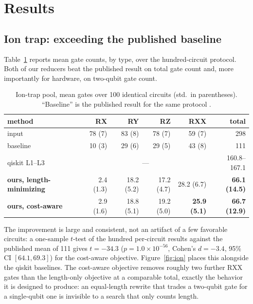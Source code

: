 \documentclass[11pt]{article}
\begin{document}
\section{Results}
\label{sec:results}

\subsection{Ion trap: exceeding the published baseline}
\label{sec:ion-result}

Table~\ref{tab:ion} reports mean gate counts, by type, over the
hundred-circuit protocol. Both of our reducers beat the published result
on total gate count and, more importantly for hardware, on two-qubit gate
count.

\begin{table}[H]
\centering
\caption{Ion-trap pool, mean gates over 100 identical circuits (std.\ in
parentheses). ``Baseline'' is the published result for the same protocol
\cite{Rosenhahn2025Optimization}.}
\label{tab:ion}
\begin{tabular}{lrrrrr}
\toprule
method & RX & RY & RZ & RXX & total \\
\midrule
input             & 78 (7)      & 83 (8)      & 78 (7)      & 59 (7)      & 298 \\
baseline \cite{Rosenhahn2025Optimization} & 10 (3) & 29 (6) & 29 (5) & 43 (8) & 111 \\
qiskit L1--L3     & \multicolumn{4}{c}{---}                              & 160.8--167.1 \\
\textbf{ours, length-minimizing} & 2.4 (1.3)  & 18.2 (5.2) & 17.2 (4.7) & 28.2 (6.7) & \textbf{66.1 (14.5)} \\
\textbf{ours, cost-aware}        & 2.9 (1.6)  & 18.8 (5.1) & 19.2 (5.0) & \textbf{25.9 (5.1)} & \textbf{66.7 (12.9)} \\
\bottomrule
\end{tabular}
\end{table}

The improvement is large and consistent, not an artifact of a few
favorable circuits: a one-sample $t$-test of the hundred per-circuit
results against the published mean of 111 gives $t=-34.3$
($p=1.0\times10^{-56}$, Cohen's $d=-3.4$, 95\% CI $[64.1,69.3]$) for the
cost-aware objective. Figure~\ref{fig:ion} places this alongside the
qiskit baselines. The cost-aware objective removes roughly two further
RXX gates than the length-only objective at a comparable total, exactly
the behavior it is designed to produce: an equal-length rewrite that
trades a two-qubit gate for a single-qubit one is invisible to a search
that only counts length.
\end{document}
